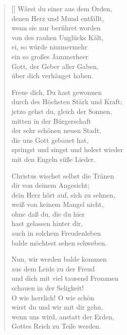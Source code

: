 \begin{multicols}{2}
\begin{verse}[\versewidth]
 Wärst du einer aus dem Orden,\\
denen Herz und Mund entfällt,\\
wenn sie nur berühret worden\\
von des rauhen Unglücks Kält,\\
ei, so würde nimmermehr\\
ein so großes Jammerheer\\
Gott, der Geber aller Gaben,\\
über dich verhänget haben.

 Freue dich, Du hast gewonnen\\
durch des Höchsten Stärk und Kraft;\\
jetzo gehst du, gleich der Sonnen,\\
mitten in der Bürgerschaft\\
der sehr schönen neuen Stadt,\\
die uns Gott gebauet hat,\\
springst und singst und holest wieder\\
mit den Engeln süße Lieder.

 Christus wischet selbst die Tränen\\
dir von deinem Angesicht;\\
dein Herz hört auf, sich zu sehnen,\\
weiß von keinem Mangel nicht,\\
ohne daß du, die du hier\\
hast gelassen hinter dir,\\
auch in solchem Freudenleben\\
balde möchtest sehen schweben.

 Nun, wir werden balde kommen\\
aus dem Leide zu der Freud\\
und dich mit viel tausend Frommen\\
schauen in der Seligkeit!\\
O wie herrlich! O wie schön\\
wirst du und wir mit dir gehn,\\
wenn uns wird, anstatt der Erden,\\
Gottes Reich zu Teile werden.
   
\end{verse}
\end{multicols}
